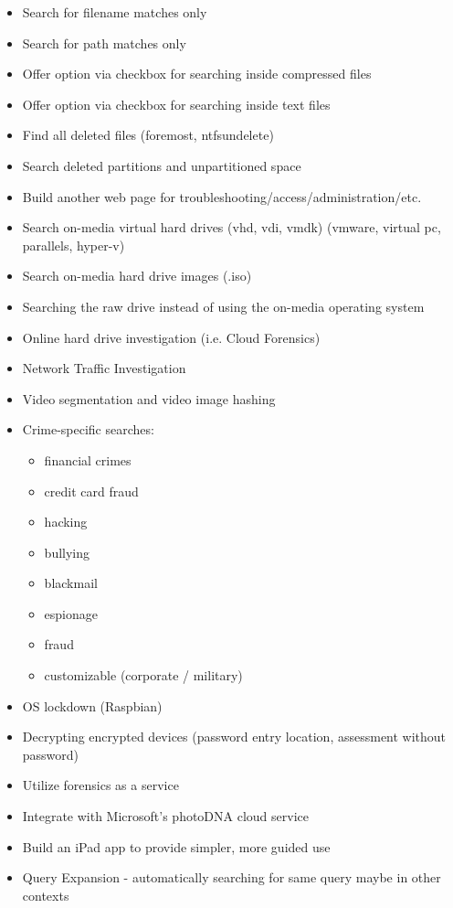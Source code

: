 \documentclass[12pt]{article}
\begin{document}
{\begin{itemize}
  \item Search for filename matches only
  \item Search for path matches only
  \item Offer option via checkbox for searching inside compressed files
  \item Offer option via checkbox for searching inside text files
  \item Find all deleted files (foremost, ntfsundelete)
  \item Search deleted partitions and unpartitioned space
  \item Build another web page for troubleshooting/access/administration/etc.
  \item Search on-media virtual hard drives (vhd, vdi, vmdk) (vmware, virtual pc, parallels, hyper-v)
  \item Search on-media hard drive images (.iso)
  \item Searching the raw drive instead of using the on-media operating system
  \item Online hard drive investigation (i.e. Cloud Forensics)
  \item Network Traffic Investigation
  \item Video segmentation and video image hashing
  \item Crime-specific searches:
  \begin{itemize}
    \item financial crimes
    \item credit card fraud
    \item hacking
    \item bullying
    \item blackmail
    \item espionage
    \item fraud
    \item customizable (corporate / military)
  \end{itemize}
  \item OS lockdown (Raspbian)
  \item Decrypting encrypted devices (password entry location, assessment without password)
  \item Utilize forensics as a service
  \item Integrate with Microsoft's photoDNA cloud service
  \item Build an iPad app to provide simpler, more guided use
  \item Query Expansion - automatically searching for same query maybe in other contexts

\end{itemize}}
\end{document}
